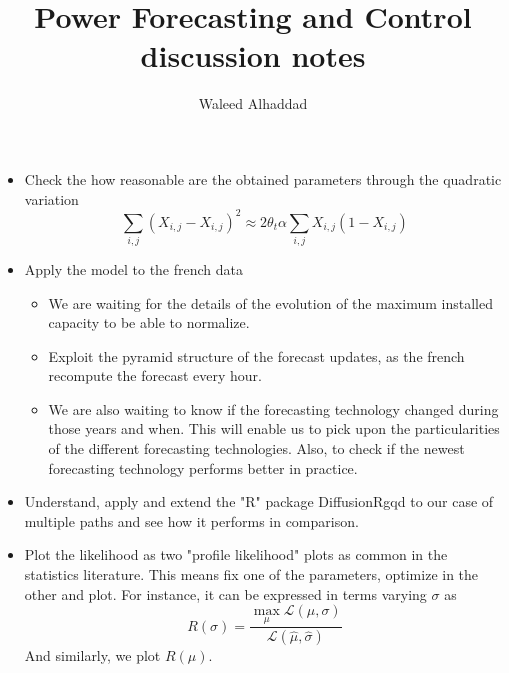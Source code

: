 \documentclass[a4paper, 12pt]{article}
\title{Power Forecasting and Control\\ discussion notes}
\author{Waleed Alhaddad }
\date{}
\begin{document}
\maketitle

\begin{itemize}
\item Check the how reasonable are the obtained parameters through the quadratic variation
\begin{equation}
\sum_{i,j} (X_{i,j} - X_{i,j})^2 \approx 2 \theta_t \alpha \sum_{i,j}  X_{i,j} (1-X_{i,j})
\end{equation}
\item Apply the model to the french data 
	\begin{itemize}
	\item We are waiting for the details of the evolution of the maximum installed capacity to be able to normalize.
	\item Exploit the pyramid structure of the forecast updates, as the french 	recompute the forecast every hour.
	\item We are also waiting to know if the forecasting technology changed during those years and when. This will enable us to  pick upon the particularities of the different forecasting technologies. Also, to check if the newest forecasting technology performs better in practice.
	\end{itemize}
\item Understand, apply and extend the "R" package DiffusionRgqd to our case of multiple paths and see how it performs in comparison.
\item Plot the likelihood as two "profile likelihood" plots as common in the statistics literature. This means fix one of the parameters, optimize in the other and plot. For instance, it  can be expressed in terms varying $\sigma$ as
\begin{equation}
R(\sigma) = \frac{\max_\mu \mathcal{L}(\mu, \sigma)}{\mathcal{L}(\hat{\mu}, \hat{\sigma})}
\end{equation}
And similarly, we plot $R(\mu)$. 


\end{itemize}
\end{document}
